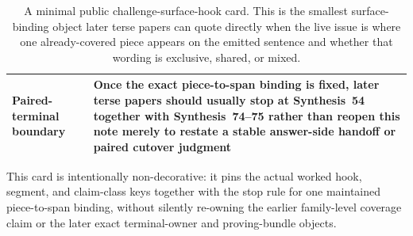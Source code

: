 \documentclass[11pt]{article}
\begin{document}
\begin{table}[t]
\begin{tabularx}{\linewidth}{@{}lX@{}}
Paired-terminal boundary & Once the exact piece-to-span binding is fixed, later terse papers should usually stop at Synthesis~54 together with Synthesis~74--75 rather than reopen this note merely to restate a stable answer-side handoff or paired cutover judgment \\
\bottomrule
\end{tabularx}
\caption{A minimal public challenge-surface-hook card. This is the smallest surface-binding object later terse papers can quote directly when the live issue is where one already-covered piece appears on the emitted sentence and whether that wording is exclusive, shared, or mixed.}
\label{tab:minimal-public-challenge-surface-hook-card}
\end{table}

This card is intentionally non-decorative: it pins the actual worked hook, segment, and claim-class keys together with the stop rule for one maintained piece-to-span binding, without silently re-owning the earlier family-level coverage claim or the later exact terminal-owner and proving-bundle objects.\cite{series:workedexample}
\end{document}
